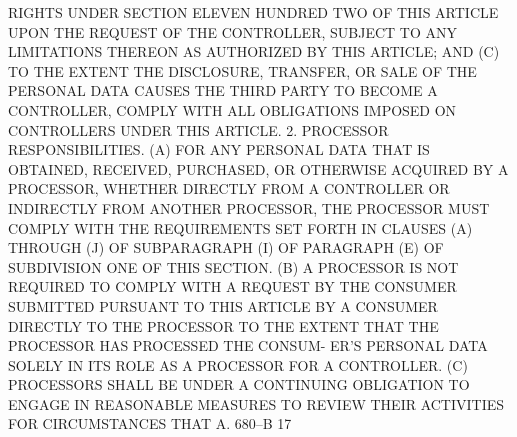  RIGHTS UNDER SECTION ELEVEN HUNDRED TWO OF THIS ARTICLE UPON THE REQUEST
 OF  THE  CONTROLLER, SUBJECT TO ANY LIMITATIONS THEREON AS AUTHORIZED BY
 THIS ARTICLE; AND
   (C) TO THE EXTENT THE DISCLOSURE, TRANSFER, OR SALE  OF  THE  PERSONAL
 DATA  CAUSES  THE  THIRD  PARTY  TO BECOME A CONTROLLER, COMPLY WITH ALL
 OBLIGATIONS IMPOSED ON CONTROLLERS UNDER THIS ARTICLE.
   2. PROCESSOR RESPONSIBILITIES. (A)  FOR  ANY  PERSONAL  DATA  THAT  IS
 OBTAINED,  RECEIVED,  PURCHASED,  OR  OTHERWISE ACQUIRED BY A PROCESSOR,
 WHETHER DIRECTLY FROM A CONTROLLER OR INDIRECTLY FROM ANOTHER PROCESSOR,
 THE PROCESSOR MUST COMPLY WITH THE REQUIREMENTS SET FORTH IN CLAUSES (A)
 THROUGH (J) OF SUBPARAGRAPH (I) OF PARAGRAPH (E) OF SUBDIVISION  ONE  OF
 THIS SECTION.
   (B)  A  PROCESSOR  IS  NOT  REQUIRED  TO  COMPLY WITH A REQUEST BY THE
 CONSUMER SUBMITTED PURSUANT TO THIS ARTICLE BY A  CONSUMER  DIRECTLY  TO
 THE PROCESSOR TO THE EXTENT THAT THE PROCESSOR HAS PROCESSED THE CONSUM-
 ER'S PERSONAL DATA SOLELY IN ITS ROLE AS A PROCESSOR FOR A CONTROLLER.
   (C)  PROCESSORS  SHALL  BE  UNDER A CONTINUING OBLIGATION TO ENGAGE IN
 REASONABLE MEASURES TO REVIEW THEIR ACTIVITIES  FOR  CIRCUMSTANCES  THAT
 A. 680--B                          17
 
